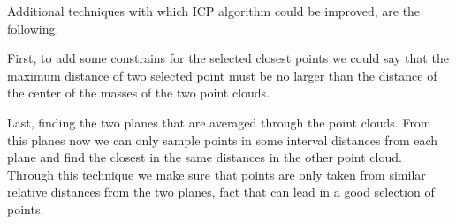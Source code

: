 Additional techniques with which ICP algorithm could be improved, are the following. 

First, to add some constrains for the selected closest points we could say that the maximum distance of two selected point must be no larger than the distance of the center of the masses of the two point clouds. 

Last, finding the two planes that are averaged through the point clouds. From this planes now we can only sample points in some interval distances from each plane and find the closest in the same distances in the other point cloud. Through this technique we make sure that points are only taken from similar relative distances from the two planes, fact that can lead in a good selection of points.

